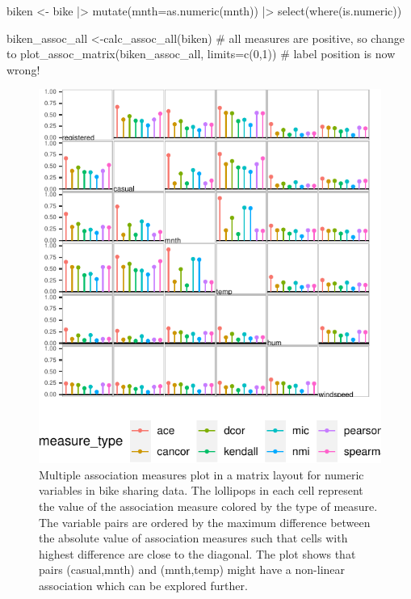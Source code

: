 \begin{Schunk}
\begin{Sinput}
biken <- bike |>
  mutate(mnth=as.numeric(mnth)) |>
  select(where(is.numeric))

biken_assoc_all <-calc_assoc_all(biken)
# all measures are positive, so change to
plot_assoc_matrix(biken_assoc_all, limits=c(0,1)) # label position is now wrong!
\end{Sinput}
\begin{figure}

{\centering \includegraphics{rj_paper_files/figure-latex/compare-matrix-1} 

}

\caption[Multiple association measures plot in a matrix layout for numeric variables in bike sharing data]{Multiple association measures plot in a matrix layout for numeric variables in bike sharing data. The lollipops in each cell represent the value of the association measure colored by the type of measure. The variable pairs are ordered by the maximum difference between the absolute value of association measures such that cells with highest difference are close to the diagonal. The plot shows that pairs (casual,mnth) and (mnth,temp) might have a non-linear association which can be explored further.}\label{fig:compare-matrix}
\end{figure}
\end{Schunk}

